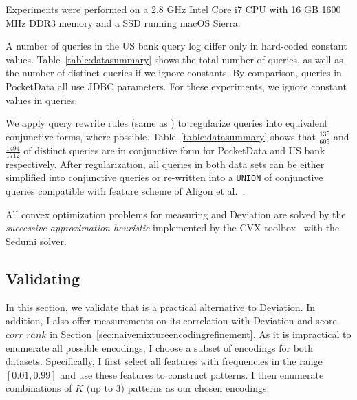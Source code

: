 \label{sec:commonexperimentsettings}
Experiments were performed on a 2.8 GHz Intel Core i7 CPU with 16 GB 1600 MHz DDR3 memory and a SSD running macOS Sierra.

A number of queries in the US bank query log differ only in hard-coded constant values.
Table~\ref{table:datasummary} shows the total number of queries, as well as the number of distinct queries if we ignore constants.
By comparison, queries in PocketData all use JDBC parameters.
For these experiments, we ignore constant values in queries.

We apply query rewrite rules (same as \cite{8352666}) to regularize queries into equivalent conjunctive forms, where possible. 
Table~\ref{table:datasummary} shows that $\frac{135}{605}$ and $\frac{1494}{1712}$ of distinct queries are in conjunctive form for PocketData and US bank respectively. 
After regularization, all queries in both data sets can be either simplified into conjunctive queries or re-written into a \texttt{UNION} of conjunctive queries compatible with feature scheme of Aligon et al.~\cite{DBLP:journals/kais/AligonGMRT14}.

All convex optimization problems for measuring \errorname and Deviation are solved by the \textit{successive approximation heuristic} implemented by the CVX toolbox~\cite{cvx} with the Sedumi solver.

\subsection{Validating \Errorname}
\label{sec:motivateencodingerror}
In this section, we validate that \errorname is a practical alternative to Deviation.
In addition, I also offer measurements on its correlation with Deviation and score $corr\_rank$ in Section~\ref{sec:naivemixtureencodingrefinement}.
%
As it is impractical to enumerate all possible encodings, I choose a subset of encodings for both datasets. 
Specifically, I first select all features with frequencies in the range $[0.01,0.99]$ and use these features to construct patterns.
I then enumerate combinations of $K$ (up to 3) patterns as our chosen encodings.

